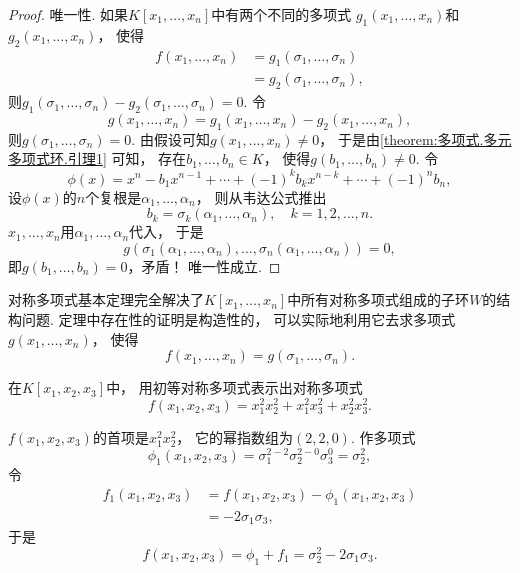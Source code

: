 \begin{theorem}[对称多项式基本定理]
\begin{proof}
唯一性.
如果\(K[x_1,\dotsc,x_n]\)中有两个不同的多项式
\(g_1(x_1,\dotsc,x_n)\)和\(g_2(x_1,\dotsc,x_n)\)，
使得\begin{align*}
	f(x_1,\dotsc,x_n)
	&=g_1(\sigma_1,\dotsc,\sigma_n) \\
	&=g_2(\sigma_1,\dotsc,\sigma_n),
\end{align*}
则\(g_1(\sigma_1,\dotsc,\sigma_n)-g_2(\sigma_1,\dotsc,\sigma_n)=0\).
令\begin{equation*}
	g(x_1,\dotsc,x_n)
	=g_1(x_1,\dotsc,x_n)-g_2(x_1,\dotsc,x_n),
\end{equation*}
则\(g(\sigma_1,\dotsc,\sigma_n)=0\).
由假设可知\(g(x_1,\dotsc,x_n)\neq0\)，
于是由\cref{theorem:多项式.多元多项式环.引理1} 可知，
存在\(b_1,\dotsc,b_n \in K\)，
使得\(g(b_1,\dotsc,b_n)\neq0\).
令\begin{equation*}
	\phi(x)=x^n-b_1x^{n-1}+\dotsb+(-1)^kb_kx^{n-k}+\dotsb+(-1)^nb_n,
\end{equation*}
设\(\phi(x)\)的\(n\)个复根是\(\alpha_1,\dotsc,\alpha_n\)，
则从韦达公式推出\begin{equation*}
	b_k=\sigma_k(\alpha_1,\dotsc,\alpha_n),
	\quad
	k=1,2,\dotsc,n.
\end{equation*}
\(x_1,\dotsc,x_n\)用\(\alpha_1,\dotsc,\alpha_n\)代入，
于是\begin{equation*}
	g(\sigma_1(\alpha_1,\dotsc,\alpha_n),\dotsc,\sigma_n(\alpha_1,\dotsc,\alpha_n))=0,
\end{equation*}
即\(g(b_1,\dotsc,b_n)=0\)，矛盾！
唯一性成立.
\end{proof}
\end{theorem}

对称多项式基本定理完全解决了\(K[x_1,\dotsc,x_n]\)中所有对称多项式组成的子环\(W\)的结构问题.
定理中存在性的证明是构造性的，
可以实际地利用它去求多项式\(g(x_1,\dotsc,x_n)\)，
使得\begin{equation*}
	f(x_1,\dotsc,x_n)
	=g(\sigma_1,\dotsc,\sigma_n).
\end{equation*}

\begin{example}
在\(K[x_1,x_2,x_3]\)中，
用初等对称多项式表示出对称多项式\begin{equation*}
	f(x_1,x_2,x_3)
	=x_1^2 x_2^2
	+x_1^2 x_3^2
	+x_2^2 x_3^2.
\end{equation*}
\begin{solution}
\(f(x_1,x_2,x_3)\)的首项是\(x_1^2 x_2^2\)，
它的幂指数组为\((2,2,0)\).
作多项式\begin{equation*}
	\phi_1(x_1,x_2,x_3)
	=\sigma_1^{2-2} \sigma_2^{2-0} \sigma_3^0
	=\sigma_2^2,
\end{equation*}
令\begin{align*}
	f_1(x_1,x_2,x_3)
	&= f(x_1,x_2,x_3)
	- \phi_1(x_1,x_2,x_3) \\
	&= -2 \sigma_1 \sigma_3,
\end{align*}
于是\begin{equation*}
	f(x_1,x_2,x_3)
	=\phi_1+f_1
	=\sigma_2^2 - 2 \sigma_1 \sigma_3.
\end{equation*}
\end{solution}
\end{example}

